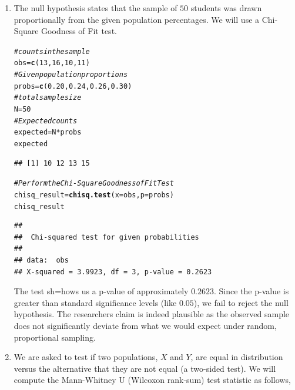 \documentclass[12pt,english]{article}\usepackage[]{graphicx}\usepackage[]{xcolor}
\makeatletter
\newcommand{\hlnum}[1]{\textcolor[rgb]{0.686,0.059,0.569}{#1}}%
\newcommand{\hlcom}[1]{\textcolor[rgb]{0.678,0.584,0.686}{\textit{#1}}}%
\newcommand{\hlopt}[1]{\textcolor[rgb]{0,0,0}{#1}}%
\newcommand{\hldef}[1]{\textcolor[rgb]{0.345,0.345,0.345}{#1}}%
\newcommand{\hlkwb}[1]{\textcolor[rgb]{0.69,0.353,0.396}{#1}}%
\newcommand{\hlkwc}[1]{\textcolor[rgb]{0.333,0.667,0.333}{#1}}%
\newcommand{\hlkwd}[1]{\textcolor[rgb]{0.737,0.353,0.396}{\textbf{#1}}}%
\newenvironment{kframe}{%
 \def\at@end@of@kframe{}%
 \ifinner\ifhmode%
  \def\at@end@of@kframe{\end{minipage}}%
  \begin{minipage}{\columnwidth}%
 \fi\fi%
 \def\FrameCommand##1{\hskip\@totalleftmargin \hskip-\fboxsep
 \colorbox{shadecolor}{##1}\hskip-\fboxsep
     \hskip-\linewidth \hskip-\@totalleftmargin \hskip\columnwidth}%
 \MakeFramed {\advance\hsize-\width
   \@totalleftmargin\z@ \linewidth\hsize
   \@setminipage}}%
 {\par\unskip\endMakeFramed%
 \at@end@of@kframe}
\newenvironment{knitrout}{}{} %
\makeatother
\begin{document}
\begin{enumerate}[label=\arabic*.]
\begin{enumerate}[label=(\alph*)]
\begin{knitrout}
\begin{kframe}
\end{kframe}
\end{knitrout}
		\item The p-value (approximately $0.0339$) represents the probability of observing a sample mean of $8.515$ or higher, assuming that the true population mean is exactly $8.5$. Because our calculated p-value of $0.0339$ is strictly greater than the significance level of $\alpha = 0.005$, we fail to reject the null hypothesis. There is not enough statistical evidence at the $0.005$ level to conclude that the mean years of schooling for people $18$ or above is greater than $8.5$ years.  
	\end{enumerate}
	\item The null hypothesis states that the sample of $50$ students was drawn proportionally from the given population percentages. We will use a Chi-Square Goodness of Fit test.

\begin{knitrout}
\color{fgcolor}\begin{kframe}
\begin{alltt}
\hlcom{#counts in the sample}
\hldef{obs} \hlkwb{=} \hlkwd{c}\hldef{(}\hlnum{13}\hldef{,} \hlnum{16}\hldef{,} \hlnum{10}\hldef{,} \hlnum{11}\hldef{)}
\hlcom{#Given population proportions}
\hldef{probs} \hlkwb{=} \hlkwd{c}\hldef{(}\hlnum{0.20}\hldef{,} \hlnum{0.24}\hldef{,} \hlnum{0.26}\hldef{,} \hlnum{0.30}\hldef{)}
\hlcom{#total sample size}
\hldef{N} \hlkwb{=} \hlnum{50}
\hlcom{#Expected counts}
\hldef{expected} \hlkwb{=} \hldef{N} \hlopt{*} \hldef{probs}
\hldef{expected}
\end{alltt}
\begin{verbatim}
## [1] 10 12 13 15
\end{verbatim}
\begin{alltt}
\hlcom{#Perform the Chi-Square Goodness of Fit Test}
\hldef{chisq_result} \hlkwb{=} \hlkwd{chisq.test}\hldef{(}\hlkwc{x} \hldef{= obs,} \hlkwc{p} \hldef{= probs)}
\hldef{chisq_result}
\end{alltt}
\begin{verbatim}
## 
## 	Chi-squared test for given probabilities
## 
## data:  obs
## X-squared = 3.9923, df = 3, p-value = 0.2623
\end{verbatim}
\end{kframe}
\end{knitrout}
	The test sh=hows us a p-value of approximately $0.2623$. Since the p-value is greater than standard significance levels (like $0.05$), we fail to reject the null hypothesis. The researchers claim is indeed plausible as the observed sample does not significantly deviate from what we would expect under random, proportional sampling.	
	\item We are asked to test if two populations, $X$ and $Y$, are equal in distribution versus the alternative that they are not equal (a two-sided test). We will compute the Mann-Whitney U (Wilcoxon rank-sum) test statistic as follows,


\end{enumerate}
\end{document}
